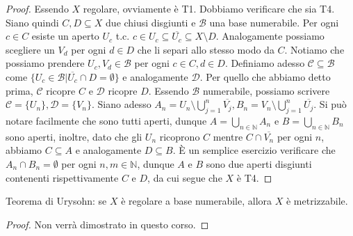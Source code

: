 \begin{proof}
  Essendo $X$ regolare, ovviamente è T1. Dobbiamo verificare che sia T4. Siano quindi $C, D \subseteq X$ due chiusi disgiunti e $\mathcal{B}$ una base numerabile. Per ogni $c \in C$ esiste un aperto $U_c$ t.c. $c \in U_c \subseteq  \overline{U_c} \subseteq X \setminus D$. Analogamente possiamo
  scegliere un $V_d$ per ogni $d \in D$ che li separi allo stesso modo da $C$. Notiamo che possiamo prendere $U_c, V_d \in \mathcal{B}$ per ogni $c \in C, d \in D$. Definiamo adesso $\mathcal{C} \subseteq \mathcal{B}$ come $\{U_c \in \mathcal{B} | \overline{U_c} \cap D=\emptyset\}$ e analogamente $\mathcal{D}$.
  Per quello che abbiamo detto prima, $\mathcal{C}$ ricopre $C$ e $\mathcal{D}$ ricopre $D$. Essendo $\mathcal{B}$ numerabile, possiamo scrivere $\mathcal{C}=\{U_n\}, \mathcal{D}=\{V_n\}$. Siano adesso $\displaystyle A_n= U_n \setminus \bigcup_{j=1}^n \overline{V_j}, B_n =V_n \setminus \bigcup_{j=1}^n \overline{U_j}$. Si può notare facilmente che sono tutti
  aperti, dunque $\displaystyle A= \bigcup_{n \in \mathbb{N}} A_n$ e $\displaystyle B= \bigcup_{n \in \mathbb{N}} B_n$ sono aperti, inoltre, dato che gli $U_n$ ricoprono $C$ mentre $C \cap \overline{V_n}$ per ogni $n$, abbiamo $C \subseteq A$ e analogamente $D \subseteq B$. È un semplice
  esercizio verificare che $A_n \cap B_n = \emptyset$ per ogni $n, m \in \mathbb{N}$, dunque $A$ e $B$ sono due aperti disgiunti contenenti rispettivamente $C$ e $D$, da cui segue che $X$ è T4.
\end{proof}

\begin{thm}
  Teorema di Urysohn: se $X$ è regolare a base numerabile, allora $X$ è metrizzabile.
\end{thm}

\begin{proof}
  Non verrà dimostrato in questo corso.
\end{proof}
